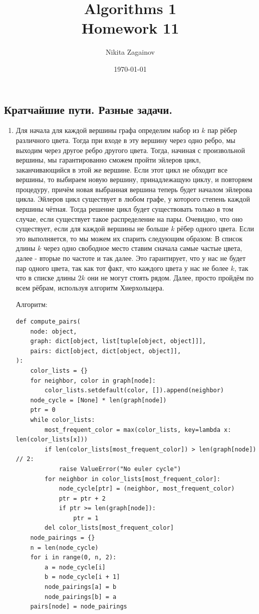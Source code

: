 \documentclass{article}
\title{Algorithms 1 \\ Homework 11}
\author{Nikita Zagainov}
\date{\selectlanguage{english}\today}
\begin{document}
\maketitle

\begin{center}
	\section{Кратчайшие пути. Разные задачи.}
\end{center}
\begin{enumerate}
	\item Для начала для каждой вершины графа определим
	      набор из $k$ пар рёбер различного цвета. Тогда
	      при входе в эту вершину через одно ребро, мы выходим
	      через другое ребро другого цвета. Тогда, начиная с произвольной
	      вершины, мы гарантированно сможем пройти эйлеров цикл, заканчивающийся
	      в этой же вершине. Если этот цикл не обходит все вершины, то
	      выбираем новую вершину, принадлежащую циклу, и повторяем процедуру,
	      причём новая выбранная вершина теперь будет началом эйлерова цикла.
	      Эйлеров цикл существует в любом графе, у которого степень каждой вершины
	      чётная. Тогда решение цикл будет существовать только в том
	      случае, если существует такое распределение на пары. Очевидно, что
	      оно существует, если для каждой вершины не больше $k$ рёбер
	      одного цвета. Если это выполняется, то мы можем их спарить
	      следующим образом: В список длины $k$ через одно свободное место
	      ставим сначала самые частые цвета, далее - вторые по частоте
	      и так далее. Это гарантирует, что у нас не будет пар одного цвета,
	      так как тот факт, что каждого цвета у нас не более $k$, так
	      что в списке длины $2k$ они не могут стоять рядом. Далее,
	      просто пройдём по всем рёбрам, используя алгоритм Хиерхольцера.

	      Алгоритм:
	      \begin{lstlisting}
def compute_pairs(
    node: object,
    graph: dict[object, list[tuple[object, object]]],
    pairs: dict[object, dict[object, object]],
):
    color_lists = {}
    for neighbor, color in graph[node]:
        color_lists.setdefault(color, []).append(neighbor)
    node_cycle = [None] * len(graph[node])
    ptr = 0
    while color_lists:
        most_frequent_color = max(color_lists, key=lambda x: len(color_lists[x]))
        if len(color_lists[most_frequent_color]) > len(graph[node]) // 2:
            raise ValueError("No euler cycle")
        for neighbor in color_lists[most_frequent_color]:
            node_cycle[ptr] = (neighbor, most_frequent_color)
            ptr = ptr + 2
            if ptr >= len(graph[node]):
                ptr = 1
        del color_lists[most_frequent_color]
    node_pairings = {}
    n = len(node_cycle)
    for i in range(0, n, 2):
        a = node_cycle[i]
        b = node_cycle[i + 1]
        node_pairings[a] = b
        node_pairings[b] = a
    pairs[node] = node_pairings



\end{lstlisting}
\end{enumerate}
\end{document}
